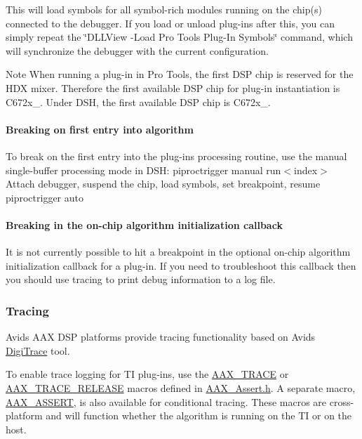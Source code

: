 This will load symbols for all symbol-\/rich modules running on the chip(s) connected to the debugger. If you load or unload plug-\/ins after this, you can simply repeat the \char`\"{}\+D\+L\+L\+View -\/\+Load Pro Tools Plug-\/\+In Symbols\char`\"{} command, which will synchronize the debugger with the current configuration.

\begin{DoxyNote}{Note}
When running a plug-\/in in Pro Tools, the first D\+SP chip is reserved for the H\+DX mixer. Therefore the first available D\+SP chip for plug-\/in instantiation is {\ttfamily C672x\+\_}. Under D\+SH, the first available D\+SP chip is {\ttfamily C672x\+\_}.
\end{DoxyNote}
\hypertarget{a00832_subsubsection__breaking_on_first_entry_into_algorithm_}{}\paragraph{Breaking on first entry into algorithm}\label{a00832_subsubsection__breaking_on_first_entry_into_algorithm_}
 To break on the first entry into the plug-\/in\textquotesingle{}s processing routine, use the manual single-\/buffer processing mode in D\+SH\+:  {\ttfamily piproctrigger manual}   {\ttfamily run$<$index$>$ }  Attach debugger, suspend the chip, load symbols, set breakpoint, resume   {\ttfamily piproctrigger auto }

\hypertarget{a00832_subsubsection__breaking_on_algorithm_initialization}{}\paragraph{Breaking in the on-\/chip algorithm initialization callback}\label{a00832_subsubsection__breaking_on_algorithm_initialization}
 It is not currently possible to hit a breakpoint in the optional on-\/chip algorithm initialization callback for a plug-\/in. If you need to troubleshoot this callback then you should use tracing to print debug information to a log file.

\hypertarget{a00832_subsection__tracing}{}\subsubsection{Tracing}\label{a00832_subsection__tracing}
Avid\textquotesingle{}s A\+AX D\+SP platforms provide tracing functionality based on Avid\textquotesingle{}s \mbox{\hyperlink{a00834}{Digi\+Trace}} tool.

To enable trace logging for TI plug-\/ins, use the \mbox{\hyperlink{a00395_ab53f1d6a94f8b6ebb3a101f71bfe4e82}{A\+A\+X\+\_\+\+T\+R\+A\+CE}} or \mbox{\hyperlink{a00395_ac2aa820ece56bb59140ad561218db4b3}{A\+A\+X\+\_\+\+T\+R\+A\+C\+E\+\_\+\+R\+E\+L\+E\+A\+SE}} macros defined in {\ttfamily \mbox{\hyperlink{a00395}{A\+A\+X\+\_\+\+Assert.\+h}}}. A separate macro, \mbox{\hyperlink{a00395_a168ee44fd7a5485ab50160db36fb2988}{A\+A\+X\+\_\+\+A\+S\+S\+E\+RT}}, is also available for conditional tracing. These macros are cross-\/platform and will function whether the algorithm is running on the TI or on the host.

